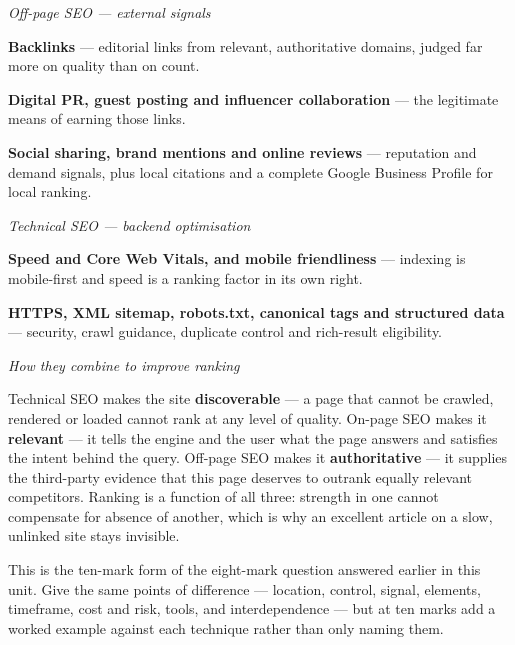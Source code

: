 \begin{qlist}
\textit{Off-page SEO --- external signals}
\begin{apts}\setcounter{enumi}{4}
\item \textbf{Backlinks} --- editorial links from relevant, authoritative
      domains, judged far more on quality than on count.
\item \textbf{Digital PR, guest posting and influencer collaboration} --- the
      legitimate means of earning those links.
\item \textbf{Social sharing, brand mentions and online reviews} --- reputation
      and demand signals, plus local citations and a complete Google Business
      Profile for local ranking.
\end{apts}

\textit{Technical SEO --- backend optimisation}
\begin{apts}\setcounter{enumi}{7}
\item \textbf{Speed and Core Web Vitals, and mobile friendliness} --- indexing
      is mobile-first and speed is a ranking factor in its own right.
\item \textbf{HTTPS, XML sitemap, robots.txt, canonical tags and structured
      data} --- security, crawl guidance, duplicate control and rich-result
      eligibility.
\end{apts}

\textit{How they combine to improve ranking}
\begin{apts}\setcounter{enumi}{9}
\item Technical SEO makes the site \textbf{discoverable} --- a page that cannot
      be crawled, rendered or loaded cannot rank at any level of quality.
      On-page SEO makes it \textbf{relevant} --- it tells the engine and the
      user what the page answers and satisfies the intent behind the query.
      Off-page SEO makes it \textbf{authoritative} --- it supplies the
      third-party evidence that this page deserves to outrank equally relevant
      competitors. Ranking is a function of all three: strength in one cannot
      compensate for absence of another, which is why an excellent article on a
      slow, unlinked site stays invisible.
\end{apts}

This is the ten-mark form of the eight-mark question answered earlier in this
unit. Give the same points of difference --- location, control, signal,
elements, timeframe, cost and risk, tools, and interdependence --- but at ten
marks add a worked example against each technique rather than only naming them.


\end{qlist}
